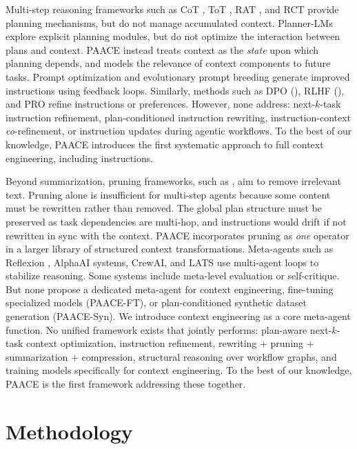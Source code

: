 \documentclass{article}
\theoremstyle{plain}
\theoremstyle{definition}
\theoremstyle{remark}
\begin{document}
Multi-step reasoning frameworks such as CoT \citep{wei2022cot},
ToT \citep{yao2023tree},
RAT \citep{zhang2023rat},
and RCT \citep{zhou2023rct}
provide planning mechanisms, but do not manage accumulated context. Planner-LMs \citep{huang2024plan}
explore explicit planning modules, but do not optimize the interaction
between plans and context. PAACE instead treats context as the \emph{state} upon which planning depends,
and models the relevance of context components to future tasks. Prompt optimization and evolutionary prompt breeding
\citep{zhou2023largepromptopt, pryzant2023automated}
generate improved instructions using feedback loops.
Similarly, methods such as DPO (\citealp{rafailov2023dpo}),
RLHF (\citealp{ouyang2022rlhf}), and PRO \citep{saunders2024pro}
refine instructions or preferences. However, none address: next-$k$-task instruction refinement, plan-conditioned instruction rewriting, instruction-context \emph{co}-refinement, or instruction updates during agentic workflows. To the best of our knowledge, PAACE introduces the first systematic approach to full context engineering, including instructions.

Beyond summarization, pruning frameworks, such as \citep{wu2024provence}, aim to remove irrelevant text. Pruning alone is insufficient for multi-step agents because some content must be rewritten rather than removed. The global plan structure must be preserved as task dependencies are multi-hop, and instructions would drift if not rewritten in sync with the context. PAACE incorporates pruning as \emph{one} operator in a larger library of structured context transformations. Meta-agents such as Reflexion \citep{shinn2023reflexion},
AlphaAI systems, CrewAI, and LATS \citep{zhou2022lats}
use multi-agent loops to stabilize reasoning.
Some systems include meta-level evaluation or self-critique. But none propose a dedicated meta-agent for context engineering, fine-tuning specialized models (PAACE-FT), or plan-conditioned synthetic dataset generation (PAACE-Syn). We introduce context engineering as a core meta-agent function. No unified framework exists
that jointly performs: plan-aware next-$k$-task context optimization, instruction refinement, rewriting + pruning + summarization + compression, structural reasoning over workflow graphs, and training models specifically for context engineering. To the best of our knowledge, PAACE is the first framework addressing these together.

\section{Methodology}
\label{sec:method}
\end{document}
